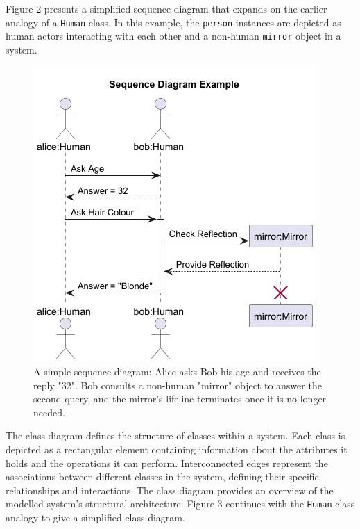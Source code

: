 \documentclass{article}
\newcounter{subsubsubsection}[subsubsection]
\begin{document}
{Figure 2 presents a simplified sequence diagram that expands on the earlier analogy of a \texttt{Human} class. In this example, the \texttt{person} instances are depicted as human actors interacting with each other and a non-human \texttt{mirror} object in a system.

\begin{figure}[H]
    \centering
\includegraphics[width=0.7\linewidth]{SDexample-Sequence_Diagram_Example.png}
    \caption{A simple sequence diagram: Alice asks Bob his age and receives the reply "32". Bob consults a non-human "mirror" object to answer the second query, and the mirror's lifeline terminates once it is no longer needed.}
    \label{fig:Simple SD}
\end{figure}


The class diagram defines the structure of classes within a system\cite{Seidl_Scholz_Huemer_Kappel_Duffy_2014}. Each class is depicted as a rectangular element containing information about the attributes it holds and the operations it can perform. Interconnected edges represent the associations between different classes in the system, defining their specific relationships and interactions. The class diagram provides an overview of the modelled system's structural architecture. Figure 3 continues with the \texttt{Human} class analogy to give a simplified class diagram.

}
\end{document}
